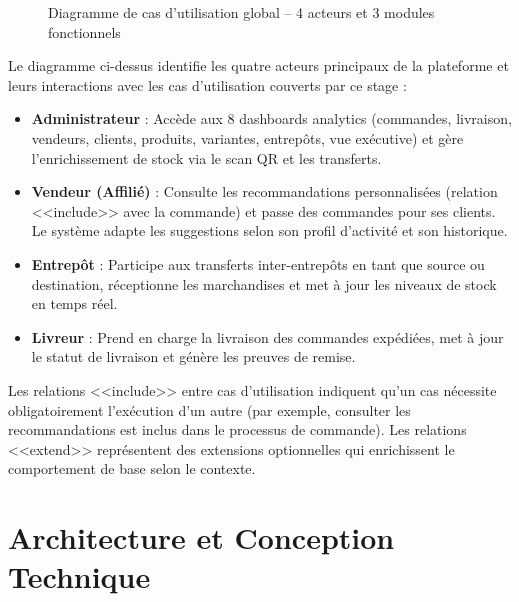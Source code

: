 \documentclass[12pt,a4paper,openany]{report}
\begin{document}
\begin{figure}[H]
\caption{Diagramme de cas d'utilisation global -- 4 acteurs et 3 modules fonctionnels}
\end{figure}

Le diagramme ci-dessus identifie les quatre acteurs principaux de la plateforme et leurs interactions avec les cas d'utilisation couverts par ce stage :

\begin{itemize}
  \item \textbf{Administrateur} : Accède aux 8 dashboards analytics (commandes, livraison, vendeurs, clients, produits, variantes, entrepôts, vue exécutive) et gère l'enrichissement de stock via le scan QR et les transferts.
  \item \textbf{Vendeur (Affilié)} : Consulte les recommandations personnalisées (relation <<include>> avec la commande) et passe des commandes pour ses clients. Le système adapte les suggestions selon son profil d'activité et son historique.
  \item \textbf{Entrepôt} : Participe aux transferts inter-entrepôts en tant que source ou destination, réceptionne les marchandises et met à jour les niveaux de stock en temps réel.
  \item \textbf{Livreur} : Prend en charge la livraison des commandes expédiées, met à jour le statut de livraison et génère les preuves de remise.
\end{itemize}

Les relations <<include>> entre cas d'utilisation indiquent qu'un cas nécessite obligatoirement l'exécution d'un autre (par exemple, consulter les recommandations est inclus dans le processus de commande). Les relations <<extend>> représentent des extensions optionnelles qui enrichissent le comportement de base selon le contexte.


\chapter[Architecture et Conception]{Architecture et Conception Technique}
\end{document}
